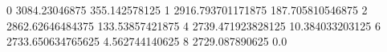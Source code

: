 0 3084.23046875 355.142578125
1 2916.793701171875 187.705810546875
2 2862.62646484375 133.53857421875
4 2739.471923828125 10.384033203125
6 2733.650634765625 4.562744140625
8 2729.087890625 0.0
